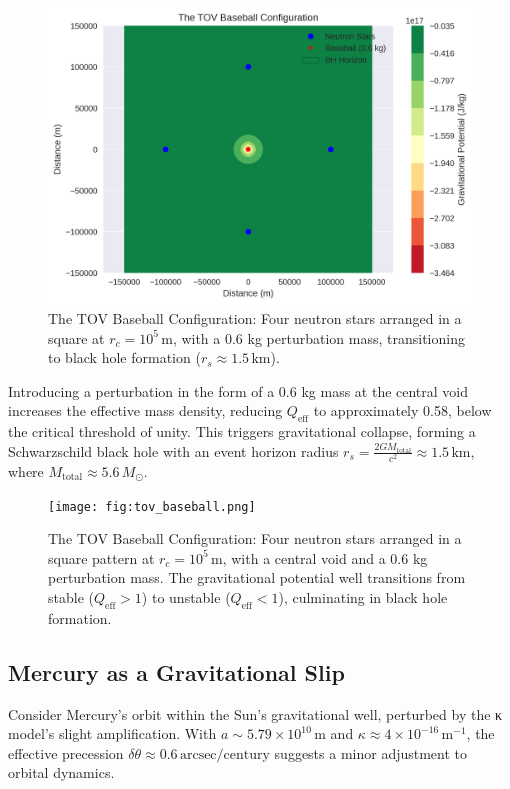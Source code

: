 \documentclass[a4paper,12pt]{article}
\begin{document}
\begin{figure}[htbp]
    \centering
    \includegraphics[width=0.7\linewidth]{figures/tov_baseball.png}
    \caption{The TOV Baseball Configuration: Four neutron stars arranged in a square at \( r_c = 10^5 \, \text{m} \), with a 0.6 kg perturbation mass, transitioning to black hole formation (\( r_s \approx 1.5 \, \text{km} \)).}
    \label{fig:tov_baseball}
\end{figure}

Introducing a perturbation in the form of a 0.6 kg mass at the central void increases the effective mass density, reducing \( Q_{\mathrm{eff}} \) to approximately 0.58, below the critical threshold of unity. This triggers gravitational collapse, forming a Schwarzschild black hole with an event horizon radius \( r_s = \frac{2 G M_{\mathrm{total}}}{c^2} \approx 1.5 \, \text{km} \), where \( M_{\mathrm{total}} \approx 5.6 \, M_{\odot} \).

\begin{figure}[H]
    \centering
    \texttt{[image: fig:tov\_baseball.png]}
    \caption{The TOV Baseball Configuration: Four neutron stars arranged in a square pattern at \( r_c = 10^5 \, \text{m} \), with a central void and a 0.6 kg perturbation mass. The gravitational potential well transitions from stable (\( Q_{\mathrm{eff}} > 1 \)) to unstable (\( Q_{\mathrm{eff}} < 1 \)), culminating in black hole formation.}
    \label{fig:tov_baseball}
\end{figure}

\subsection{Mercury as a Gravitational Slip}
Consider Mercury’s orbit within the Sun’s gravitational well, perturbed by the κ model’s slight amplification. With \( a \sim 5.79 \times 10^{10} \, \text{m} \) and \( \kappa \approx 4 \times 10^{-16} \, \text{m}^{-1} \), the effective precession \( \delta\theta \approx 0.6 \, \text{arcsec/century} \) suggests a minor adjustment to orbital dynamics.
\end{document}
